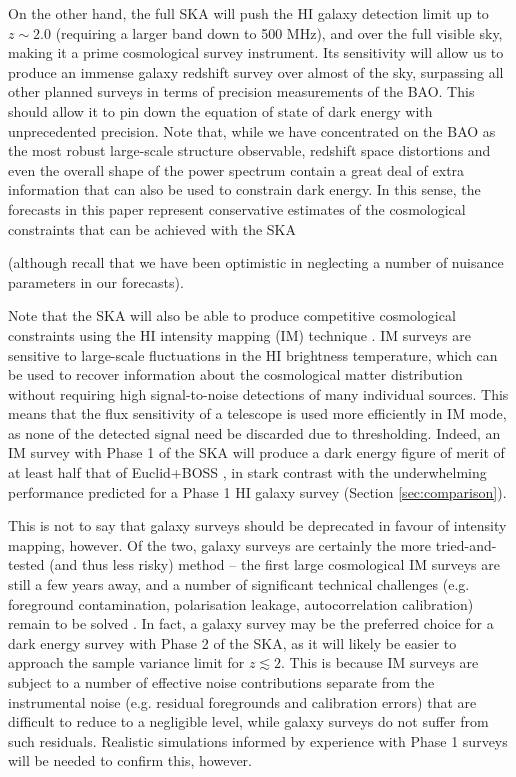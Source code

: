 \documentclass[useAMS,usenatbib]{mn2e}
\newcommand{\corr}{\color{blue}} %
\begin{document}
On the other hand, the full SKA will push the HI galaxy detection limit up to $z \sim 2.0$ (requiring a larger band down to 500 MHz), and over the full visible sky, making it a prime cosmological survey instrument. Its sensitivity will allow us to produce an immense galaxy redshift survey over almost  of the sky, surpassing all other planned surveys in terms of precision measurements of the BAO. This should allow it to pin down the equation of state of dark energy with unprecedented precision. Note that, while we have concentrated on the BAO as the most robust large-scale structure observable, redshift space distortions and even the overall shape of the power spectrum contain a great deal of extra information that can also be used to constrain dark energy. In this sense, the forecasts in this paper represent conservative estimates of the cosmological constraints that can be achieved with the SKA {\corr (although recall that we have been optimistic in neglecting a number of nuisance parameters in our forecasts). 

Note that the SKA will also be able to produce competitive cosmological constraints using the HI intensity mapping (IM) technique \citep{Bull:2014rha}. IM surveys are sensitive to large-scale fluctuations in the HI brightness temperature, which can be used to recover information about the cosmological matter distribution without requiring high signal-to-noise detections of many individual sources. This means that the flux sensitivity of a telescope is used more efficiently in IM mode, as none of the detected signal need be discarded due to thresholding. Indeed, an IM survey with Phase 1 of the SKA will produce a dark energy figure of merit of at least half that of Euclid+BOSS \citep{Bull:2015nra}, in stark contrast with the underwhelming performance predicted for a Phase 1 HI galaxy survey (Section \ref{sec:comparison}).

This is not to say that galaxy surveys should be deprecated in favour of intensity mapping, however. Of the two, galaxy surveys are certainly the more tried-and-tested (and thus less risky) method -- the first large cosmological IM surveys are still a few years away, and a number of significant technical challenges (e.g. foreground contamination, polarisation leakage, autocorrelation calibration) remain to be solved \citep{Santos:2015gra}. In fact, a galaxy survey may be the preferred choice for a dark energy survey with Phase 2 of the SKA, as it will likely be easier to approach the sample variance limit for $z \lesssim 2$. This is because IM surveys are subject to a number of effective noise contributions separate from the instrumental noise (e.g. residual foregrounds and calibration errors) that are difficult to reduce to a negligible level, while galaxy surveys do not suffer from such residuals. Realistic simulations informed by experience with Phase 1 surveys will be needed to confirm this, however.}
\end{document}

